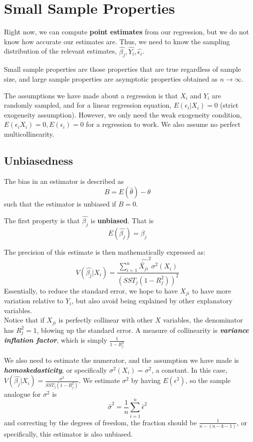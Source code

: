 \section{Small Sample Properties}
Right now, we can compute \textbf{point estimates} from our regression, but we do not know how accurate our estimates are. Thus, we need to know the sampling distribution of the relevant estimates, $\hat{\beta_j}, \hat{Y_i}, \hat{\epsilon_i}$.

Small sample properties are those properties that are true regardless of sample size, and large sample properties are asymptotic properties obtained as $n \to \infty$.

The assumptions we have made about a regression is that $X_i$ and $Y_i$ are randomly sampled, and for a linear regression equation, $E(\epsilon_i | X_i) = 0$ (strict exogeneity assumption). However, we only need the weak exogeneity condition, $E(\epsilon_i X_i) = 0, E(\epsilon_i) = 0$ for a regression to work. We also assume no perfect multicollinearity.

\subsection{Unbiasedness}
The bias in an estimator is described as
$$B = E(\hat{\theta}) - \theta$$
such that the estimator is unbiased if $B = 0$.

The first property is that $\hat{\beta_j}$ is \textbf{unbiased}. That is
$$E(\hat{\beta_j}) = \beta_j$$

The precision of this estimate is then mathematically expressed as:
$$V(\hat{\beta_j} | X_i) = \frac{\sum_{i=1}^{n} \hat{\tilde{X_{ji}}}^2 \sigma^2(X_i)}{(SST_j (1 - R_j^2))^2}$$
Essentially, to reduce the standard error, we hope to have $X_{ji}$ to have more variation relative to $Y_i$, but also avoid being explained by other explanatory variables. \\
Notice that if $X_{ji}$ is perfectly collinear with other $X$ variables, the denominator has $R_j^2 = 1$, blowing up the standard error. A measure of collinearity is \textbf{\textit{variance inflation factor}}, which is simply $\frac{1}{1 - R_j^2}$

We also need to estimate the numerator, and the assumption we have made is \textbf{\textit{homoskedasticity}}, or specifically $\sigma^2(X_i) = \sigma^2$, a constant. In this case, $V(\hat{\beta_j} | X_i) = \frac{\sigma^2}{SST_j (1 - R_j^2)}$. We estimate $\sigma^2$ by having $E(\epsilon^2)$, so the sample analogue for $\sigma^2$ is
$$\hat{\sigma}^2 = \frac{1}{n} \sum_{i=1}^{n} \hat{\epsilon}^2$$
and correcting by the degrees of freedom, the fraction should be $\frac{1}{n - (n - k - 1)}$, or specifically, this estimator is also unbiased.

